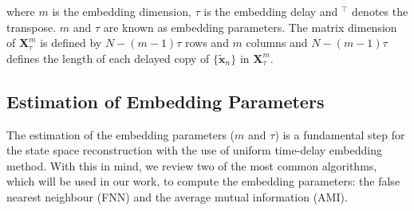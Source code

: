 \documentclass[fleqn,10pt]{wlscirep}
\begin{document}
where $m$ is the embedding dimension, $\tau$ is the embedding delay and
$ ^\intercal$ denotes the transpose.
$m$ and $\tau$ are known as embedding parameters.
The matrix dimension of $ \boldsymbol{X}_{\tau}^{m} $ is defined by
$N-(m-1)\tau$ rows and $m$ columns and 
$N-(m-1)\tau$ defines the length of each delayed copy 
of $\{ \boldsymbol{ \tilde{x} }_n \}$ in $\boldsymbol{X}^{m}_{\tau}$.

\subsection*{Estimation of Embedding Parameters}
The estimation of the embedding parameters ($m$ and $\tau$) 
is a fundamental step for the state space reconstruction with the use
of uniform time-delay embedding method.
With this in mind, we review two of the most common algorithms,
which will be used in our work, to compute the embedding
parameters: the false nearest neighbour (FNN) and the average mutual information (AMI).

\end{document}
